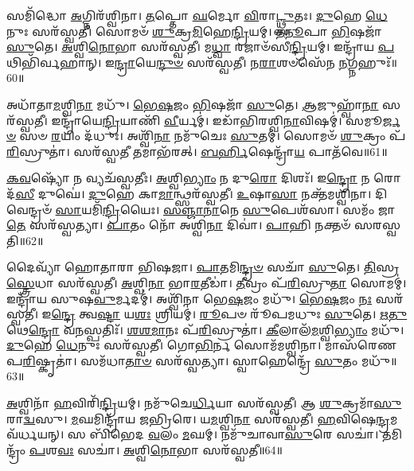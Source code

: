 𑌸𑌮𑌿᳴𑌦𑍍𑌧𑍋 \ul{𑌅}\-𑌗𑍍𑌨𑌿𑌰᳴𑌶𑍍𑌵𑌿𑌨𑌾।
\-\ul{𑌤}\-𑌪𑍍𑌤𑍋 \ul{𑌘}\-𑌰𑍍𑌮𑍋 \ul{𑌵𑌿}\-𑌰𑌾\-\ul{𑌟𑍍𑌥𑍍𑌸𑍁}\-𑌤𑌃।
\-\ul{𑌦𑍁}\-𑌹𑍇 \ul{𑌧𑍇}\-𑌨𑍁𑌃 𑌸𑌰᳴𑌸𑍍𑌵𑌤𑍀।
𑌸𑍋𑌮𑍞᳴ \ul{𑌶𑍁}\-𑌕𑍍𑌰\-\ul{𑌮𑌿}\-𑌹𑍇\-\ul{𑌨𑍍𑌦𑍍𑌰𑌿}\-𑌯𑌮𑍍।
\-\ul{𑌤}\-\-\ul{𑌨𑍂}\-𑌪𑌾 \ul{𑌭𑌿}\-𑌷𑌜𑌾᳴ \ul{𑌸𑍁}\-𑌤𑍇।
\-\ul{𑌅}\-𑌶𑍍𑌵𑌿\-\ul{𑌨𑍋}\-𑌭𑌾 𑌸𑌰᳴𑌸𑍍𑌵𑌤𑍀।
𑌮\-\ul{𑌧𑍍𑌵𑌾} 𑌰𑌜𑌾𑍞᳴𑌸𑍀\-\ul{𑌨𑍍𑌦𑍍𑌰𑌿}\-𑌯𑌮𑍍।
𑌇𑌨𑍍𑌦𑍍𑌰𑌾᳴𑌯 \ul{𑌪}\-𑌥𑌿𑌭𑌿᳴𑌰𑍍𑌵𑌹𑌾𑌨𑍍।
𑌇\-\ul{𑌨𑍍𑌦𑍍𑌰𑌾}\-𑌯𑍇\-\ul{𑌨𑍍𑌦𑍁}\-\-\ul{𑍞} 𑌸𑌰᳴𑌸𑍍𑌵𑌤𑍀।
𑌨\-\ul{𑌰𑌾}\-𑌶𑍞𑌸𑍇᳴𑌨 \ul{𑌨}\-𑌗𑍍𑌨𑌹𑍁𑌃᳴॥60॥

𑌅𑌧𑌾᳴𑌤𑌾\-\ul{𑌮}\-𑌶𑍍𑌵𑌿\-\ul{𑌨𑌾} 𑌮𑌧𑍁᳴।
\-\ul{𑌭𑍇}\-\-\ul{𑌷}\-𑌜𑌂 \ul{𑌭𑌿}\-𑌷𑌜𑌾᳴ \ul{𑌸𑍁}\-𑌤𑍇।
\-\ul{𑌆}\-𑌜𑍁𑌹𑍍𑌵𑌾᳴\-\ul{𑌨𑌾} 𑌸𑌰᳴𑌸𑍍𑌵𑌤𑍀।
𑌇𑌨𑍍𑌦𑍍𑌰𑌾᳴𑌯𑍇\-\ul{𑌨𑍍𑌦𑍍𑌰𑌿}\-𑌯𑌾𑌣𑌿᳴ \ul{𑌵𑍀}\-𑌰𑍍𑌯𑌮𑍍॑।
𑌇𑌡𑌾᳴𑌭𑌿𑌰𑌶𑍍𑌵𑌿\-\ul{𑌨𑌾}\-𑌵𑌿𑌷𑌮𑍍॑।
𑌸𑌮𑍂\-\ul{𑌰𑍍𑌜}\-\-\ul{𑍞} 𑌸𑍞 \ul{𑌰}\-𑌯𑌿𑌂 𑌦᳴𑌧𑍁𑌃।
𑌅𑌶𑍍𑌵𑌿᳴\-\ul{𑌨𑌾} 𑌨𑌮𑍁᳴𑌚𑍇𑌃 \ul{𑌸𑍁}\-𑌤𑌮𑍍।
𑌸𑍋𑌮𑍞᳴ \ul{𑌶𑍁}\-𑌕𑍍𑌰𑌂 𑌪᳴\-\ul{𑌰𑌿}\-𑌸𑍍𑌰𑍁𑌤𑌾॑।
𑌸𑌰᳴𑌸𑍍𑌵\-\ul{𑌤𑍀} 𑌤𑌮𑌾𑌭᳴𑌰𑌤𑍍।
\-\ul{𑌬}\-\-\ul{𑌰𑍍}\-𑌹𑌿𑌷𑍇𑌨𑍍𑌦𑍍𑌰𑌾᳴\-\ul{𑌯} 𑌪𑌾𑌤᳴𑌵𑍇॥61॥

\-\ul{𑌕}\-\-\ul{𑌵}\-𑌷𑍍𑌯𑍋᳴ 𑌨 𑌵𑍍𑌯𑌚᳴𑌸𑍍𑌵𑌤𑍀𑌃।
\-\ul{𑌅}\-𑌶𑍍𑌵𑌿\-\ul{𑌭𑍍𑌯𑌾𑌂} 𑌨 𑌦𑍁\-\ul{𑌰𑍋} 𑌦𑌿𑌶𑌃᳴।
𑌇\-\ul{𑌨𑍍𑌦𑍍𑌰𑍋} 𑌨 𑌰𑍋𑌦᳴\-\ul{𑌸𑍀} 𑌦𑍁𑌘𑍇॑।
\-\ul{𑌦𑍁}\-𑌹𑍇 𑌕𑌾\-\ul{𑌮𑌾}\-𑌨𑍍𑌥𑍍𑌸𑌰᳴𑌸𑍍𑌵𑌤𑍀।
\-\ul{𑌉}\-𑌷𑌾\-\ul{𑌸𑌾} 𑌨𑌕𑍍𑌤᳴𑌮𑌶𑍍𑌵𑌿𑌨𑌾।
𑌦𑌿𑌵𑍇𑌨𑍍𑌦𑍍𑌰𑍞᳴ \ul{𑌸𑌾}\-𑌯𑌮𑌿᳴\-\ul{𑌨𑍍𑌦𑍍𑌰𑌿}\-𑌯𑍈𑌃।
\-\ul{𑌸}\-\-\ul{𑌞𑍍𑌜𑌾}\-\-\ul{𑌨𑌾}\-𑌨𑍇 \ul{𑌸𑍁}\-𑌪𑍇𑌶᳴𑌸𑌾।
𑌸𑌮𑌂᳴ 𑌜𑌾\-\ul{𑌤𑍇} 𑌸𑌰᳴𑌸𑍍𑌵𑌤𑍍𑌯𑌾।
\-\ul{𑌪𑌾}\-𑌤𑌂 𑌨𑍋᳴ 𑌅𑌶𑍍𑌵𑌿\-\ul{𑌨𑌾} 𑌦𑌿𑌵𑌾॑।
\-\ul{𑌪𑌾}\-𑌹𑌿 𑌨𑌕𑍍𑌤𑍞᳴ 𑌸𑌰𑌸𑍍𑌵𑌤𑌿॥62॥

𑌦𑍈𑌵𑍍𑌯𑌾᳴ 𑌹𑍋𑌤𑌾𑌰𑌾 𑌭𑌿𑌷𑌜𑌾।
\-\ul{𑌪𑌾}\-𑌤𑌮𑌿\-\ul{𑌨𑍍𑌦𑍍𑌰}\-\-\ul{𑍞} 𑌸𑌚𑌾᳴ \ul{𑌸𑍁}\-𑌤𑍇।
\-\ul{𑌤𑌿}\-𑌸𑍍𑌰\-\ul{𑌸𑍍𑌤𑍍𑌰𑍇}\-𑌧𑌾 𑌸𑌰᳴𑌸𑍍𑌵𑌤𑍀।
\-\ul{𑌅}\-𑌶𑍍𑌵𑌿\-\ul{𑌨𑌾} 𑌭𑌾\-\ul{𑌰}\-𑌤𑍀𑌡𑌾॑।
\-\ul{𑌤𑍀}\-𑌵𑍍𑌰𑌂 𑌪᳴\-\ul{𑌰𑌿}\-𑌸𑍍𑌰𑍁\-\ul{𑌤𑌾} 𑌸𑍋𑌮𑌮𑍍॑।
𑌇𑌨𑍍𑌦𑍍𑌰𑌾᳴𑌯 𑌸𑍁𑌷\-\ul{𑌵𑍁}\-𑌰𑍍𑌮𑌦𑌮𑍍॑।
𑌅𑌶𑍍𑌵𑌿᳴𑌨𑌾 𑌭𑍇\-\ul{𑌷}\-𑌜𑌂 𑌮𑌧𑍁᳴।
\-\ul{𑌭𑍇}\-\-\ul{𑌷}\-𑌜𑌂 \ul{𑌨𑌃} 𑌸𑌰᳴𑌸𑍍𑌵𑌤𑍀।
𑌇\-\ul{𑌨𑍍𑌦𑍍𑌰𑍇} 𑌤𑍍𑌵\-\ul{𑌷𑍍𑌟𑌾} 𑌯\-\ul{𑌶𑌃} 𑌶𑍍𑌰𑌿𑌯𑌮𑍍॑।
\-\ul{𑌰𑍂}\-𑌪𑍞 𑌰𑍂᳴𑌪𑌮𑌧𑍁𑌃 \ul{𑌸𑍁}\-𑌤𑍇।
\-\ul{𑌋}\-\-\ul{𑌤𑍁}\-𑌥𑍇\-\ul{𑌨𑍍𑌦𑍍𑌰𑍋} 𑌵\-\ul{𑌨}\-𑌸𑍍𑌪𑌤𑌿𑌃᳴।
\-\ul{𑌶}\-\-\ul{𑌶}\-\-\ul{𑌮𑌾}\-𑌨𑌃 𑌪᳴\-\ul{𑌰𑌿}\-𑌸𑍍𑌰𑍁𑌤𑌾॑।
\-\ul{𑌕𑍀}\-𑌲𑌾𑌲᳴\-\ul{𑌮}\-𑌶𑍍𑌵𑌿\-\ul{𑌭𑍍𑌯𑌾𑌂} 𑌮𑌧𑍁᳴।
\-\ul{𑌦𑍁}\-𑌹𑍇 \ul{𑌧𑍇}\-𑌨𑍁𑌃 𑌸𑌰᳴𑌸𑍍𑌵𑌤𑍀।
𑌗𑍋\-\ul{𑌭𑌿}\-𑌰𑍍𑌨 𑌸𑍋𑌮᳴𑌮𑌶𑍍𑌵𑌿𑌨𑌾।
𑌮𑌾𑌸᳴𑌰𑍇𑌣 𑌪\-\ul{𑌰𑌿}\-𑌷𑍍𑌕𑍃𑌤𑌾॑।
𑌸𑌮᳴𑌧𑌾\-\ul{𑌤𑌾}\-\-\ul{𑍞} 𑌸𑌰᳴𑌸𑍍𑌵𑌤𑍍𑌯𑌾।
𑌸𑍍𑌵𑌾𑌹𑍇𑌨𑍍𑌦𑍍𑌰𑍇᳴ \ul{𑌸𑍁}\-𑌤𑌂 𑌮𑌧𑍁᳴॥63॥\anuvakamend[\-\ul{𑌨}\-𑌗𑍍𑌨\-\ul{𑌹𑍁𑌃} 𑌪𑌾𑌤᳴𑌵𑍇 𑌸𑌰𑌸𑍍𑌵𑌤𑍍𑌯𑌧𑍁𑌃 \ul{𑌸𑍁}\-𑌤𑍇॑\-𑌽𑌷𑍍𑌟𑍗 𑌚᳴]

\-\ul{𑌅}\-𑌶𑍍𑌵𑌿𑌨𑌾᳴ \ul{𑌹}\-𑌵𑌿𑌰𑌿᳴\-\ul{𑌨𑍍𑌦𑍍𑌰𑌿}\-𑌯𑌮𑍍।
𑌨𑌮𑍁᳴𑌚𑍇\-\ul{𑌰𑍍𑌧𑌿}\-𑌯𑌾 𑌸𑌰᳴𑌸𑍍𑌵𑌤𑍀।
𑌆 \ul{𑌶𑍁}\-𑌕𑍍𑌰𑌮𑌾᳴\-\ul{𑌸𑍁}\-𑌰𑌾\-\ul{𑌦𑍍𑌵}\-𑌸𑍁।
\-\ul{𑌮}\-𑌘𑌮𑌿𑌨𑍍𑌦𑍍𑌰𑌾᳴𑌯 𑌜𑌭𑍍𑌰𑌿𑌰𑍇।
𑌯\-\ul{𑌮}\-𑌶𑍍𑌵𑌿\-\ul{𑌨𑌾} 𑌸𑌰᳴𑌸𑍍𑌵𑌤𑍀।
\-\ul{𑌹}\-𑌵𑌿𑌷𑍇\-\ul{𑌨𑍍𑌦𑍍𑌰}\-𑌮𑌵᳴𑌰𑍍𑌧𑌯𑌨𑍍।
𑌸 𑌬𑌿᳴𑌭𑍇𑌦 \ul{𑌵}\-𑌲𑌂 \ul{𑌮}\-𑌘𑌮𑍍।
𑌨𑌮𑍁᳴𑌚𑌾𑌵𑌾\-\ul{𑌸𑍁}\-𑌰𑍇 𑌸𑌚𑌾॑।
𑌤𑌮𑌿𑌨𑍍𑌦𑍍𑌰𑌂᳴ \ul{𑌪}\-𑌶\-\ul{𑌵𑌃} 𑌸𑌚𑌾॑।
\-\ul{𑌅}\-𑌶𑍍𑌵𑌿\-\ul{𑌨𑍋}\-𑌭𑌾 𑌸𑌰᳴𑌸𑍍𑌵𑌤𑍀॥64॥

